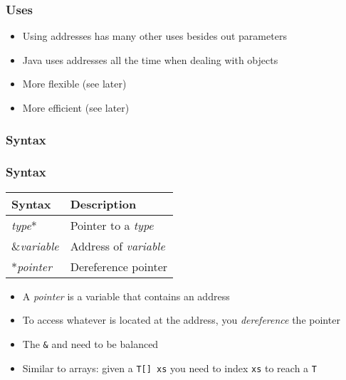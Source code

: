 \begin{frame}
  \frametitle{Uses}
  \begin{itemize}
    \item Using addresses has many other uses besides out parameters
    \item Java uses addresses all the time when dealing with objects
    \item More flexible (see later)
    \item More efficient (see later)
  \end{itemize}
\end{frame}

\begin{frame}
  \frametitle{Syntax}
  \vskip5mm

\end{frame}

\begin{frame}
  \frametitle{Syntax}
  \begin{center}
    \begin{tabular}{ll}
      \textbf{Syntax}  & \textbf{Description} \\
      \toprule
      {\it type}*      & Pointer to a {\it type} \\
      \&{\it variable} & Address of {\it variable} \\
      *{\it pointer}   & Dereference pointer \\
    \end{tabular}
  \end{center}
  \begin{itemize}
    \item A \emph{pointer} is a variable that contains an address
    \item To access whatever is located at the address, you \emph{dereference} the pointer
    \item The {\tt \&} and {\tt *} need to be balanced
    \item Similar to arrays: given a {\tt T[] xs} you need to index {\tt xs} to reach a {\tt T}
  \end{itemize}
\end{frame}

